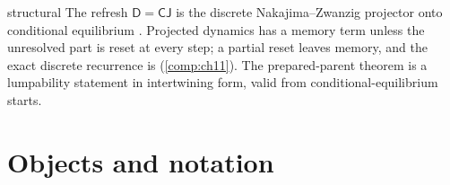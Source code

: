 \begin{analogy}{structural}
The refresh $\mathsf D=\mathsf C\mathsf J$ is the discrete Nakajima--Zwanzig projector onto
conditional equilibrium \citep{Nakajima1958,Zwanzig1960}. Projected dynamics has a memory term unless
the unresolved part is reset at every step; a partial reset leaves memory, and the exact discrete
recurrence is  (\cref{comp:ch11}). The prepared-parent theorem is a
lumpability statement \citep{KemenySnell1976} in intertwining form, valid from conditional-equilibrium
starts.
\end{analogy}

\section{Objects and notation}
\label{comp:ch08-objects}

